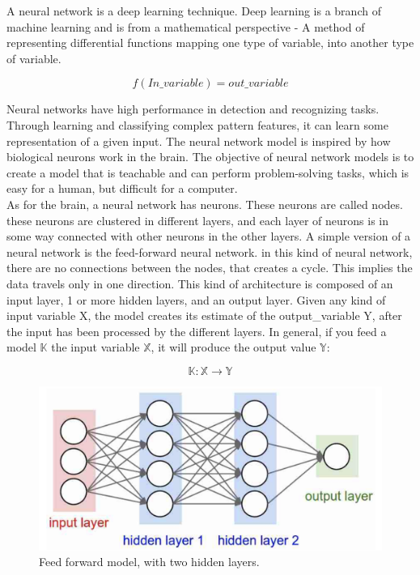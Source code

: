 A neural network is a deep learning technique. Deep learning is a branch of machine learning and is from a mathematical perspective - A method of representing differential functions mapping one type of variable, into another type of variable.

$$
f(In\_variable) = out\_variable
$$

\noindent
Neural networks have high performance in detection and recognizing tasks. Through learning and classifying complex pattern features, it can learn some representation of a given input. The neural network model is inspired by how biological neurons work in the brain. The objective of neural network models is to create a model that is teachable and can perform problem-solving tasks, which is easy for a human, but difficult for a computer.\\

\noindent
As for the brain, a neural network has neurons. These neurons are called nodes. these neurons are clustered in different layers, and each layer of neurons is in some way connected with other neurons in the other layers.  A simple version of a neural network is the feed-forward neural network. in this kind of neural network, there are no connections between the nodes, that creates a cycle. This implies the data travels only in one direction. This kind of architecture is composed of an input layer, 1 or more hidden layers, and an output layer. Given any kind of input variable X, the model creates its estimate of the output\_variable Y, after the input has been processed by the different layers.
In general, if you feed a model $\mathbb{K}$ the input variable $\mathbb{X}$, it will produce the output value $\mathbb{Y}:$

$$
\mathbb{K}: \mathbb{X} \to \mathbb{Y}
$$

\begin{figure}[!ht]
  \centering
  \includegraphics[scale=0.4]{latex/IMGs/NN.png}
  \caption{Feed forward model, with two hidden layers.}\label{Baseline:before}
\end{figure}

